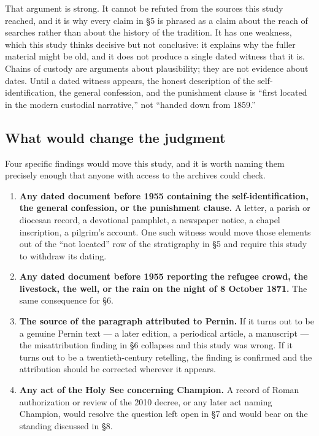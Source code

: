 That argument is strong. It cannot be refuted from the sources this
study reached, and it is why every claim in \S5 is phrased as a claim
about the reach of searches rather than about the history of the
tradition. It has one weakness, which this study thinks decisive but
not conclusive: it explains why the fuller material might be old, and
it does not produce a single dated witness that it is. Chains of
custody are arguments about plausibility; they are not evidence about
dates. Until a dated witness appears, the honest description of the
self-identification, the general confession, and the punishment clause
is ``first located in the modern custodial narrative,'' not ``handed
down from 1859.''

\subsection{What would change the judgment}

Four specific findings would move this study, and it is worth naming
them precisely enough that anyone with access to the archives could
check.

\begin{enumerate}
\item \textbf{Any dated document before 1955 containing the
self-identification, the general confession, or the punishment
clause.} A letter, a parish or diocesan record, a devotional pamphlet,
a newspaper notice, a chapel inscription, a pilgrim's account. One such
witness would move those elements out of the ``not located'' row of the
stratigraphy in \S5 and require this study to withdraw its dating.
\item \textbf{Any dated document before 1955 reporting the refugee
crowd, the livestock, the well, or the rain on the night of 8 October
1871.} The same consequence for \S6.
\item \textbf{The source of the paragraph attributed to Pernin.} If it
turns out to be a genuine Pernin text --- a later edition, a periodical
article, a manuscript --- the misattribution finding in \S6 collapses
and this study was wrong. If it turns out to be a twentieth-century
retelling, the finding is confirmed and the attribution should be
corrected wherever it appears.
\item \textbf{Any act of the Holy See concerning Champion.} A record of
Roman authorization or review of the 2010 decree, or any later act
naming Champion, would resolve the question left open in \S7 and would
bear on the standing discussed in \S8.
\end{enumerate}

